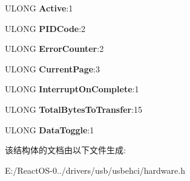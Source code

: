 \begin{DoxyCompactItemize}
\mbox{\label{struct___q_e_t_d___t_o_k_e_n___b_i_t_s_a893405f1b24d5c10cab0d8a87b618e5f}} 
U\+L\+O\+NG {\bfseries Active}\+:1
\item 
\mbox{\label{struct___q_e_t_d___t_o_k_e_n___b_i_t_s_a198d36afc99571d3c1918c3062872392}} 
U\+L\+O\+NG {\bfseries P\+I\+D\+Code}\+:2
\item 
\mbox{\label{struct___q_e_t_d___t_o_k_e_n___b_i_t_s_a8455aa5ca779d736d05b4f2f4748088e}} 
U\+L\+O\+NG {\bfseries Error\+Counter}\+:2
\item 
\mbox{\label{struct___q_e_t_d___t_o_k_e_n___b_i_t_s_a247f27281c518704944bf43a58fb0f40}} 
U\+L\+O\+NG {\bfseries Current\+Page}\+:3
\item 
\mbox{\label{struct___q_e_t_d___t_o_k_e_n___b_i_t_s_a40d60a734cb48a9dd848970d0cda2ad6}} 
U\+L\+O\+NG {\bfseries Interrupt\+On\+Complete}\+:1
\item 
\mbox{\label{struct___q_e_t_d___t_o_k_e_n___b_i_t_s_aba9f0ea64cdb9184e95bfa745cdee47a}} 
U\+L\+O\+NG {\bfseries Total\+Bytes\+To\+Transfer}\+:15
\item 
\mbox{\label{struct___q_e_t_d___t_o_k_e_n___b_i_t_s_ab26ac3a04c9d79eeb55cc69ca0aff68a}} 
U\+L\+O\+NG {\bfseries Data\+Toggle}\+:1
\end{DoxyCompactItemize}


该结构体的文档由以下文件生成\+:\begin{DoxyCompactItemize}
\item 
E\+:/\+React\+O\+S-\/0../drivers/usb/usbehci/hardware.\+h\end{DoxyCompactItemize}
